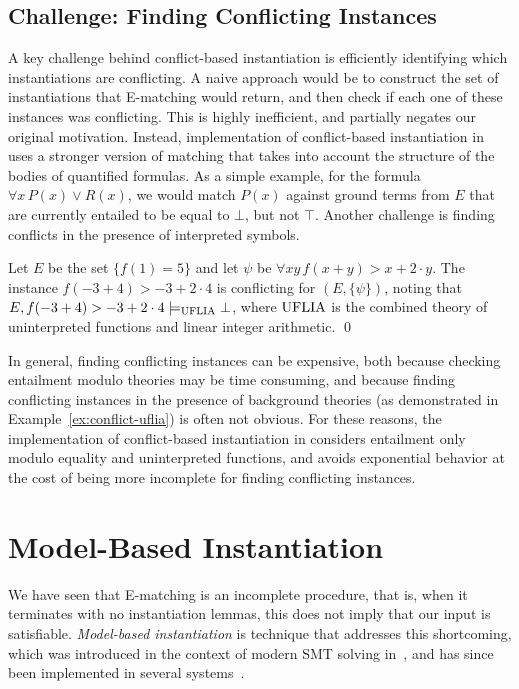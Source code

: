 \documentclass[oribibl]{llncs}
\begin{document}
\subsection{Challenge: Finding Conflicting Instances}
A key challenge behind conflict-based instantiation
is efficiently identifying which instantiations are conflicting.
A naive approach would be to construct the set of instantiations that E-matching would return, 
and then check if each one of these instances was conflicting.
This is highly inefficient, and partially negates our original motivation.
Instead, implementation of conflict-based instantiation in \cvc uses a stronger version of matching
that takes into account the structure of the bodies of quantified formulas.
As a simple example, for the formula $\forall x\, P( x ) \vee R( x )$, we would match
$P( x )$ against ground terms from $E$ that are currently entailed to be equal to $\bot$, but not $\top$.
Another challenge is finding conflicts in the presence of interpreted symbols.
\begin{example}
\label{ex:conflict-uflia}
Let $E$ be the set $\{ f( 1 ) = 5 \}$ and let $\psi$ be $\forall xy\, f( x + y ) > x + 2 \cdot y$.
The instance $f( -3 + 4 ) > -3 + 2 \cdot 4$ is conflicting for $( E, \{ \psi \} )$,
noting that $E, f( -3 + 4 ) > -3 + 2 \cdot 4 \models_{\mathrm{UFLIA}} \bot$, where $\mathrm{UFLIA}$ is the combined
theory of uninterpreted functions and linear integer arithmetic.
\qed
\end{example}
In general, finding conflicting instances can be expensive, 
both because checking entailment modulo theories may be time consuming,
and because finding conflicting instances in the presence of background theories (as demonstrated in Example~\ref{ex:conflict-uflia}) is often not obvious.
For these reasons,
the implementation of conflict-based instantiation in \cvc
considers entailment only modulo equality and uninterpreted functions,
and avoids exponential behavior at the cost of being more incomplete for finding conflicting instances. 

\section{Model-Based Instantiation}
\label{sec:mbqi}

We have seen that E-matching is an incomplete procedure,
that is, when it terminates with no instantiation lemmas, this does not imply that our input is satisfiable.
\emph{Model-based instantiation} is technique that addresses this shortcoming,
which was introduced in the context of modern SMT solving in~\cite{GeDeM-CAV-09},
and has since been implemented in several systems~\cite{Jacobs09,ReyEtAl-CADE-13}.
\end{document}
